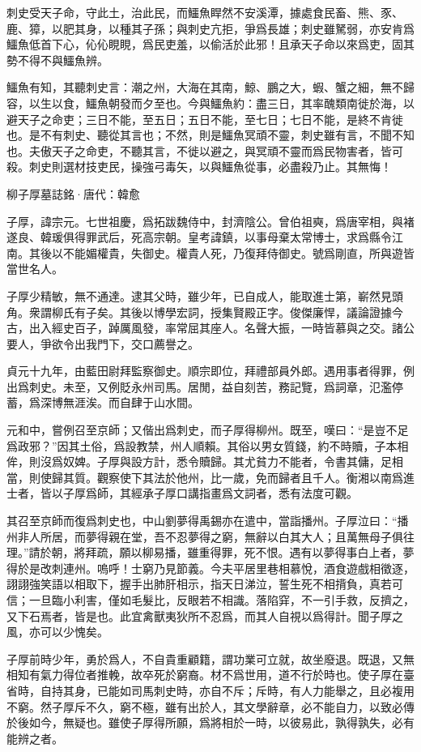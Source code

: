 \documentclass[12pt,a4paper]{ctexbook}
\begin{document}
刺史受天子命，守此土，治此民，而鱷魚睅然不安溪潭，據處食民畜、熊、豕、鹿、獐，以肥其身，以種其子孫；與刺史亢拒，爭爲長雄；刺史雖駑弱，亦安肯爲鱷魚低首下心，伈伈睍睍，爲民吏羞，以偷活於此邪！且承天子命以來爲吏，固其勢不得不與鱷魚辨。\par
鱷魚有知，其聽刺史言：潮之州，大海在其南，鯨、鵬之大，蝦、蟹之細，無不歸容，以生以食，鱷魚朝發而夕至也。今與鱷魚約：盡三日，其率醜類南徙於海，以避天子之命吏；三日不能，至五日；五日不能，至七日；七日不能，是終不肯徙也。是不有刺史、聽從其言也；不然，則是鱷魚冥頑不靈，刺史雖有言，不聞不知也。夫傲天子之命吏，不聽其言，不徙以避之，與冥頑不靈而爲民物害者，皆可殺。刺史則選材技吏民，操強弓毒矢，以與鱷魚從事，必盡殺乃止。其無悔！\par
柳子厚墓誌銘·唐代：韓愈 \par
子厚，諱宗元。七世祖慶，爲拓跋魏侍中，封濟陰公。曾伯祖奭，爲唐宰相，與褚遂良、韓瑗俱得罪武后，死高宗朝。皇考諱鎮，以事母棄太常博士，求爲縣令江南。其後以不能媚權貴，失御史。權貴人死，乃復拜侍御史。號爲剛直，所與遊皆當世名人。\par
子厚少精敏，無不通達。逮其父時，雖少年，已自成人，能取進士第，嶄然見頭角。衆謂柳氏有子矣。其後以博學宏詞，授集賢殿正字。俊傑廉悍，議論證據今古，出入經史百子，踔厲風發，率常屈其座人。名聲大振，一時皆慕與之交。諸公要人，爭欲令出我門下，交口薦譽之。\par
貞元十九年，由藍田尉拜監察御史。順宗即位，拜禮部員外郎。遇用事者得罪，例出爲刺史。未至，又例貶永州司馬。居閒，益自刻苦，務記覽，爲詞章，氾濫停蓄，爲深博無涯涘。而自肆于山水間。\par
元和中，嘗例召至京師；又偕出爲刺史，而子厚得柳州。既至，嘆曰：“是豈不足爲政邪？”因其土俗，爲設教禁，州人順賴。其俗以男女質錢，約不時贖，子本相侔，則沒爲奴婢。子厚與設方計，悉令贖歸。其尤貧力不能者，令書其傭，足相當，則使歸其質。觀察使下其法於他州，比一歲，免而歸者且千人。衡湘以南爲進士者，皆以子厚爲師，其經承子厚口講指畫爲文詞者，悉有法度可觀。\par
其召至京師而復爲刺史也，中山劉夢得禹錫亦在遣中，當詣播州。子厚泣曰：“播州非人所居，而夢得親在堂，吾不忍夢得之窮，無辭以白其大人；且萬無母子俱往理。”請於朝，將拜疏，願以柳易播，雖重得罪，死不恨。遇有以夢得事白上者，夢得於是改刺連州。嗚呼！士窮乃見節義。今夫平居里巷相慕悅，酒食遊戲相徵逐，詡詡強笑語以相取下，握手出肺肝相示，指天日涕泣，誓生死不相揹負，真若可信；一旦臨小利害，僅如毛髮比，反眼若不相識。落陷穽，不一引手救，反擠之，又下石焉者，皆是也。此宜禽獸夷狄所不忍爲，而其人自視以爲得計。聞子厚之風，亦可以少愧矣。\par
子厚前時少年，勇於爲人，不自貴重顧籍，謂功業可立就，故坐廢退。既退，又無相知有氣力得位者推輓，故卒死於窮裔。材不爲世用，道不行於時也。使子厚在臺省時，自持其身，已能如司馬刺史時，亦自不斥；斥時，有人力能舉之，且必複用不窮。然子厚斥不久，窮不極，雖有出於人，其文學辭章，必不能自力，以致必傳於後如今，無疑也。雖使子厚得所願，爲將相於一時，以彼易此，孰得孰失，必有能辨之者。\par
\end{document}
